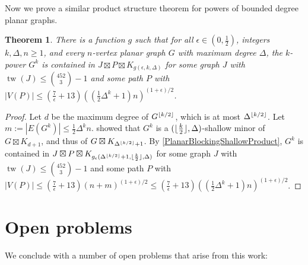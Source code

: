\documentclass[11pt]{article}
\DeclarePairedDelimiter{\floor}{\lfloor}{\rfloor}
\renewcommand{\geq}{\geqslant}
\renewcommand{\leq}{\leqslant}
\DeclareMathOperator{\tw}{tw}
\theoremstyle{plain}
\newtheorem{thm}{Theorem}
\theoremstyle{definition}
\begin{document}
Now we prove a similar product structure theorem for powers of bounded degree planar graphs.

\begin{thm}
There is a function $g$ such that for all $\epsilon\in (0,\tfrac12)$, integers $k,\Delta,n\geq 1$, and every $n$-vertex planar graph $G$ with maximum degree $\Delta$, the $k$-power $G^k$ is contained in $J \boxtimes P \boxtimes K_{g(\epsilon,k,\Delta)}$ for some graph $J$ with $\tw(J)\leq \binom{452}{3}-1$ and some path $P$ with  $|V(P)|\leq  (\frac{7}{\epsilon}+13) ((\tfrac12 \Delta^k+1) n)^{(1+\epsilon)/2}$.
\end{thm}
		
\begin{proof}
Let $d$ be the maximum degree of $G^{\floor{k/2}}$, which is at most $\Delta^{\floor{k/2}}$. 
Let $m:=|E(G^k)|\leq \frac12 \Delta^k n$. \citet[Lemma~25]{HW24} showed that $G^k$ is a $(\floor{\frac{k}{2}},\Delta)$-shallow minor of $G\boxtimes K_{d+1}$, and thus of $G\boxtimes K_{\Delta^{\floor{k/2}}+1}$. By \cref{PlanarBlockingShallowProduct}, $G^k$ is contained in $J \boxtimes P \boxtimes K_{g_{\epsilon}(\Delta^{\floor{k/2}}+1,\floor{\frac{k}{2}},\Delta)}$ for some graph $J$ with $\tw(J)\leq \binom{452}{3}-1$ and some path $P$ with $|V(P)|\leq 
(\tfrac{7}{\epsilon}+13)(n+m)^{(1+\epsilon)/2}
 \leq  (\frac{7}{\epsilon}+13) ((\tfrac12 \Delta^k+1) n)^{(1+\epsilon)/2} 
 $.
\end{proof}
		
		
		\section{Open problems}
        \label{sec:openproblems}
		
		We conclude with a number of open problems that arise from this work:
		
\end{document}
